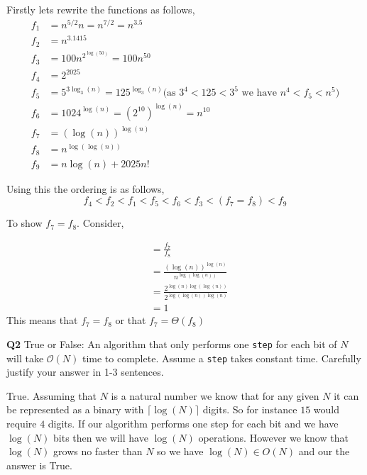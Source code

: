 \documentclass[12pt]{article}
\newcommand{\question}[3][Q]{
\begin{description}
\item \textbf{#1{#2}} #3
\end{description}
}
\newcommand{\bigO}{\mathcal{O}}
\begin{document}
\begin{answer}
    Firstly lets rewrite the functions as follows, 
    \begin{align*}
        f_1 &= n^{5 / 2}n  = n^{7 /2} = n^{3.5}\\
        f_2 &= n^{3.1415}\\
        f_3 &= 100n^{2^{\log(50)}} = 100n^{50}\\
        f_4 &= 2^{2025}\\
        f_5 &= 5^{3\log_3(n)} = 125^{\log_3(n)} (\text{as $3^{4} < 125 < 3^{5}$ we have $n^{4} < f_5 < n^{5})$}\\
        f_6 &= 1024^{\log(n)} = (2^{10})^{\log(n)} = n^{10}\\
        f_7 &= (\log(n))^{\log(n)}\\
        f_8 &= n^{\log(\log(n))}\\
        f_9 &= n\log(n) + 2025n!
    \end{align*}

    Using this the ordering is as follows, 
    $$ f_4 < f_2 < f_1 < f_5 < f_6 < f_3 < (f_7 = f_8) < f_9 $$ 


    To show $f_7 = f_8$. 
    Consider,

    \begin{align*}
        &= \frac{f_7}{f_8}\\
        &= \frac{(\log(n))^{\log(n)}}{n^{\log(\log(n))}}\\
        &= \frac{2^{\log(n)\log(\log(n))}}{2^{\log(\log(n))\log(n)}}\\
        &= 1 
    \end{align*}
    This means that $f_7 = f_8$ or that $f_7 = \Theta(f_8)$



\end{answer}

\newpage 

\question{2}{
    True or False: An algorithm that only performs one \texttt{step} for each bit of $N$ will take $\bigO(N)$ time to complete. Assume a \texttt{step} takes constant time. Carefully justify your answer in 1-3 sentences.
}

\begin{answer}
    True. Assuming that $N$ is a natural number we know that for any given $N$ it can be represented as a binary with $\lceil \log(N) \rceil$ digits. So for instance $15$ would require $4$ digits. If our algorithm performs one step for each bit and we have $\log(N)$ bits then we will have $\log(N)$ operations. However we know that $\log(N)$ grows no faster than $N$ so we have $\log(N) \in O(N)$ and our the answer is True.
\end{answer}
\end{document}
